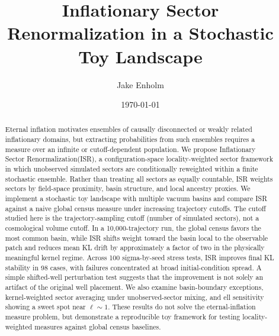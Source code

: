 \documentclass[twocolumn,prd,superscriptaddress,floatfix]{revtex4-2}
\newcommand{\isr}{Inflationary Sector Renormalization\xspace}
\newcommand{\ISR}{ISR\xspace}
\begin{document}
\title{Inflationary Sector Renormalization in a Stochastic Toy Landscape}

\author{Jake Enholm}

\date{\today}

\begin{abstract}
Eternal inflation motivates ensembles of causally disconnected or weakly related
inflationary domains, but extracting probabilities from such ensembles requires a
measure over an infinite or cutoff-dependent population.
We propose \isr (\ISR), a configuration-space locality-weighted sector framework in which
unobserved simulated sectors are conditionally reweighted within a finite stochastic ensemble.
Rather than treating all sectors as equally countable, \ISR weights sectors by
field-space proximity, basin structure, and local ancestry proxies.
We implement a stochastic toy landscape with multiple vacuum basins and compare
\ISR against a naive global census measure under increasing trajectory cutoffs.
The cutoff studied here is the trajectory-sampling cutoff (number of simulated
sectors), not a cosmological volume cutoff.
In a 10,000-trajectory run, the global census favors the most common basin, while
\ISR shifts weight toward the basin local to the observable patch and reduces
mean KL drift by approximately a factor of two in the physically meaningful
kernel regime.
Across 100 sigma-by-seed stress tests, \ISR improves final KL stability in 98
cases, with failures concentrated at broad initial-condition spread.
A simple shifted-well perturbation test suggests that the improvement is not
solely an artifact of the original well placement.
We also examine basin-boundary exceptions, kernel-weighted sector averaging under
unobserved-sector mixing, and ell sensitivity showing a sweet spot near $\ell\sim1$.
These results do not solve the eternal-inflation measure problem, but demonstrate
a reproducible toy framework for testing locality-weighted measures against
global census baselines.
\end{abstract}

\maketitle














\newpage
\appendix




\end{document}
